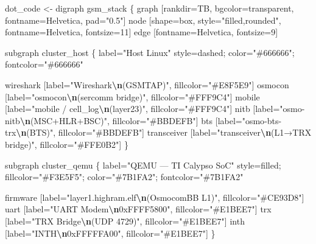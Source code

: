 \documentclass[
]{article}
\newenvironment{Shaded}{\begin{snugshade}}{\end{snugshade}}
\newcommand{\NormalTok}[1]{#1}
\newcommand{\OtherTok}[1]{\textcolor[rgb]{0.56,0.35,0.01}{#1}}
\newcommand{\SpecialCharTok}[1]{\textcolor[rgb]{0.81,0.36,0.00}{\textbf{#1}}}
\newcommand{\StringTok}[1]{\textcolor[rgb]{0.31,0.60,0.02}{#1}}
\begin{document}
\begin{Shaded}
\begin{Highlighting}[]
\NormalTok{dot\_code }\OtherTok{\textless{}{-}} \StringTok{\textquotesingle{}digraph gsm\_stack \{}
\StringTok{  graph [rankdir=TB, bgcolor=transparent, fontname=Helvetica, pad="0.5"]}
\StringTok{  node [shape=box, style="filled,rounded", fontname=Helvetica, fontsize=11]}
\StringTok{  edge [fontname=Helvetica, fontsize=9]}

\StringTok{  subgraph cluster\_host \{}
\StringTok{    label="Host Linux"}
\StringTok{    style=dashed; color="\#666666"; fontcolor="\#666666"}

\StringTok{    wireshark [label="Wireshark}\SpecialCharTok{\textbackslash{}n}\StringTok{(GSMTAP)", fillcolor="\#E8F5E9"]}
\StringTok{    osmocon [label="osmocon}\SpecialCharTok{\textbackslash{}n}\StringTok{(sercomm bridge)", fillcolor="\#FFF9C4"]}
\StringTok{    mobile [label="mobile / cell\_log}\SpecialCharTok{\textbackslash{}n}\StringTok{(layer23)", fillcolor="\#FFF9C4"]}
\StringTok{    nitb [label="osmo{-}nitb}\SpecialCharTok{\textbackslash{}n}\StringTok{(MSC+HLR+BSC)", fillcolor="\#BBDEFB"]}
\StringTok{    bts [label="osmo{-}bts{-}trx}\SpecialCharTok{\textbackslash{}n}\StringTok{(BTS)", fillcolor="\#BBDEFB"]}
\StringTok{    transceiver [label="transceiver}\SpecialCharTok{\textbackslash{}n}\StringTok{(L1→TRX bridge)", fillcolor="\#FFE0B2"]}
\StringTok{  \}}

\StringTok{  subgraph cluster\_qemu \{}
\StringTok{    label="QEMU — TI Calypso SoC"}
\StringTok{    style=filled; fillcolor="\#F3E5F5"; color="\#7B1FA2"; fontcolor="\#7B1FA2"}

\StringTok{    firmware [label="layer1.highram.elf}\SpecialCharTok{\textbackslash{}n}\StringTok{(OsmocomBB L1)", fillcolor="\#CE93D8"]}
\StringTok{    uart [label="UART Modem}\SpecialCharTok{\textbackslash{}n}\StringTok{0xFFFF5800", fillcolor="\#E1BEE7"]}
\StringTok{    trx [label="TRX Bridge}\SpecialCharTok{\textbackslash{}n}\StringTok{(UDP 4729)", fillcolor="\#E1BEE7"]}
\StringTok{    inth [label="INTH}\SpecialCharTok{\textbackslash{}n}\StringTok{0xFFFFFA00", fillcolor="\#E1BEE7"]}
\StringTok{  \}}


\end{Highlighting}
\end{Shaded}
\end{document}
